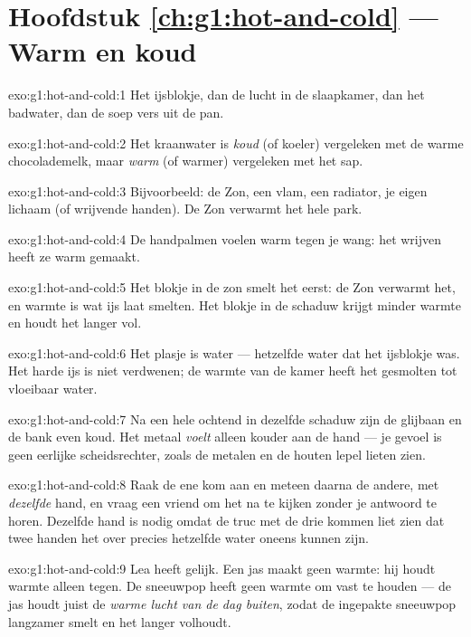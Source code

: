 \section*{Hoofdstuk \ref{ch:g1:hot-and-cold} --- Warm en koud}

\begin{solution}{exo:g1:hot-and-cold:1}
Het ijsblokje, dan de lucht in de slaapkamer, dan het badwater, dan
de soep vers uit de pan.
\end{solution}

\begin{solution}{exo:g1:hot-and-cold:2}
Het kraanwater is \emph{koud} (of koeler) vergeleken met de warme
chocolademelk, maar \emph{warm} (of warmer) vergeleken met het sap.
\end{solution}

\begin{solution}{exo:g1:hot-and-cold:3}
Bijvoorbeeld: de Zon, een vlam, een radiator, je eigen lichaam (of
wrijvende handen). De Zon verwarmt het hele park.
\end{solution}

\begin{solution}{exo:g1:hot-and-cold:4}
De handpalmen voelen warm tegen je wang: het wrijven heeft ze warm
gemaakt.
\end{solution}

\begin{solution}{exo:g1:hot-and-cold:5}
Het blokje in de zon smelt het eerst: de Zon verwarmt het, en warmte
is wat ijs laat smelten. Het blokje in de schaduw krijgt minder
warmte en houdt het langer vol.
\end{solution}

\begin{solution}{exo:g1:hot-and-cold:6}
Het plasje is water --- hetzelfde water dat het ijsblokje was. Het
harde ijs is niet verdwenen; de warmte van de kamer heeft het
gesmolten tot vloeibaar water.
\end{solution}

\begin{solution}{exo:g1:hot-and-cold:7}
Na een hele ochtend in dezelfde schaduw zijn de glijbaan en de bank
even koud. Het metaal \emph{voelt} alleen kouder aan de hand --- je
gevoel is geen eerlijke scheidsrechter, zoals de metalen en de houten
lepel lieten zien.
\end{solution}

\begin{solution}{exo:g1:hot-and-cold:8}
Raak de ene kom aan en meteen daarna de andere, met \emph{dezelfde}
hand, en vraag een vriend om het na te kijken zonder je antwoord te
horen. Dezelfde hand is nodig omdat de truc met de drie kommen
liet zien dat twee handen het over precies hetzelfde water oneens
kunnen zijn.
\end{solution}

\begin{solution}{exo:g1:hot-and-cold:9}
Lea heeft gelijk. Een jas maakt geen warmte: hij houdt warmte alleen
tegen. De sneeuwpop heeft geen warmte om vast te houden --- de jas
houdt juist de \emph{warme lucht van de dag buiten}, zodat de
ingepakte sneeuwpop langzamer smelt en het langer volhoudt.
\end{solution}
